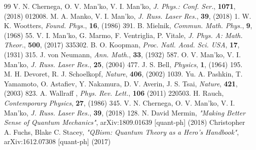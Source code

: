 \documentclass[12pt]{article}
\begin{document}
\begin{thebibliography}{99}
 V. N. Chernega, O. V. Man'ko, V. I. Man'ko, {\sl J. Phys.: Conf. Ser.},  {\bf1071}, (2018) 012008.%
 M. A. Manko, V. I. Man'ko, {\sl J. Russ. Laser Res.}, {\bf39}, (2018) 1. 
 W. K. Wootters,  {\sl Found. Phys.}, {\bf16}, (1986) 391. 
 B. Mielnik,  {\sl Commun. Math. Phys.}, { \bf 9}, (1968) 55.
V.  I. Man'ko, G. Marmo, F. Ventriglia, P. Vitale,  {\sl J. Phys. A: Math. Theor.}, {\bf500}, (2017) 335302.
 B. O. Koopman,  {\sl Proc. Natl. Acad. Sci. USA}, { \bf 17}, (1931) 315.
 J. von Neumann,  {\sl Ann. Math.},{ \bf33}, (1932) 587.
O. V. Man'ko, V. I. Man'ko,  {\sl J. Russ. Laser Res.}, { \bf25}, (2004) 477.
 J. S. Bell,  {\sl Physics}, {\bf 1}, (1964) 195.
 M. H. Devoret, R. J. Schoelkopf, {\sl Nature}, { \bf406}, (2002) 1039. 
 Yu. A. Pashkin, T. Yamamoto, O. Astafiev, Y. Nakamura, D. V. Averin, J. S. Tsai, {\sl Nature}, { \bf421}, (2003) 823.
A. Wallraff ,  {\sl Phys. Rev. Lett.}, {\bf 106} (2011) 220503.
 H. Rauch,  {\sl Contemporary Physics}, {\bf 27}, (1986) 345.
V. N. Chernega, O. V. Man'ko, V. I. Man'ko,  {\sl J. Russ. Laser Res.},  {\bf 39}, (2018) 128.
N. David Mermin, {\it "Making Better Sense of Quantum Mechanics"}, arXiv:1809.01639 [quant-ph] (2018)
Christopher A. Fuchs, Blake C. Stacey, {\it "QBism: Quantum Theory as a Hero's Handbook"},  arXiv:1612.07308 [quant-ph] (2017)


\end{thebibliography}
\end{document}
